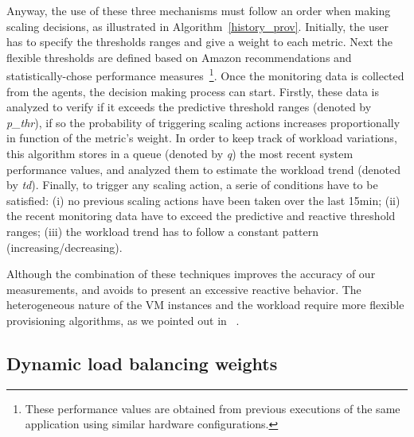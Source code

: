 Anyway, the use of these three mechanisms must follow an order when making scaling decisions, as illustrated in Algorithm~\ref{history_prov}. Initially, the user has to specify the thresholds ranges and give a weight to each metric. Next the flexible thresholds are defined based on Amazon recommendations and statistically-chose performance measures~\footnote{These performance values are obtained from previous executions of the same application using similar hardware configurations.}. Once the monitoring data is collected from the agents, the decision making process can start. Firstly, these data is analyzed to verify if it exceeds the predictive threshold ranges (denoted by \emph{p\_thr}), if so the probability of triggering scaling actions increases proportionally in function of the metric's weight. In order to keep track of workload variations, this algorithm stores in a queue (denoted by \emph{q}) the most recent system performance values, and analyzed them  to estimate the workload trend (denoted by \emph{td}). Finally, to trigger any scaling action, a serie of conditions have to be satisfied: (i) no previous scaling actions have been taken over the last 15min; (ii) the recent monitoring data have to exceed the predictive and reactive threshold ranges; (iii) the workload trend has to follow a constant pattern (increasing/decreasing). 


Although the combination of these techniques improves the accuracy of our measurements, and avoids to present an excessive reactive behavior. The heterogeneous nature of the VM instances and the workload require more flexible provisioning algorithms, as we pointed out in ~\cite{jiangThesis}. 

\subsection*{Dynamic load balancing weights}


